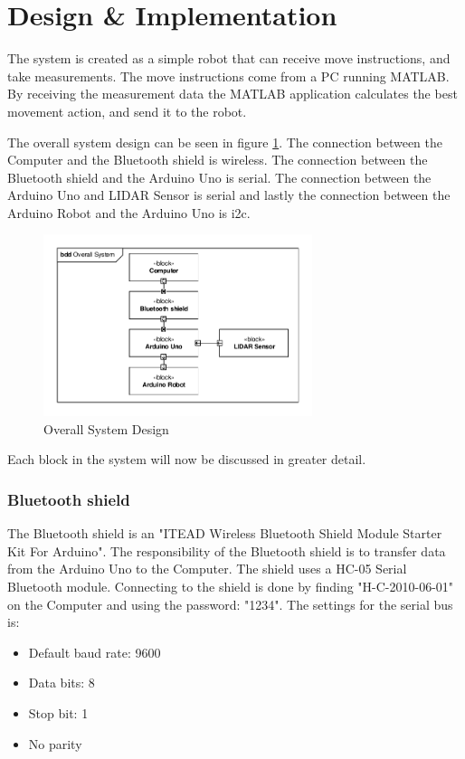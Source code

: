 \section{Design \& Implementation}
The system is created as a simple robot that can receive move instructions, and take measurements. The move instructions come from a PC running MATLAB. By receiving the measurement data the MATLAB application calculates the best movement action, and send it to the robot. 

The overall system design can be seen in figure \ref{fig:OSD}. The connection between the Computer and the Bluetooth shield is wireless. The connection between the Bluetooth shield and the Arduino Uno is serial. The connection between the Arduino Uno and LIDAR Sensor is serial and lastly the connection between the Arduino Robot and the Arduino Uno is i2c.
\begin{figure}[H]
\centering
\includegraphics[width=0.7\textwidth]{billeder/OverallSystemDesign}
\caption{Overall System Design}
\label{fig:OSD}
\end{figure}
Each block in the system will now be discussed in greater detail. 

\subsubsection{Bluetooth shield}
The Bluetooth shield is an "ITEAD Wireless Bluetooth Shield Module Starter Kit For Arduino"\cite{BTshield}\cite{BTshield2}. The responsibility of the Bluetooth shield is to transfer data from the Arduino Uno to the Computer. The shield uses a HC-05 Serial Bluetooth module. Connecting to the shield is done by finding "H-C-2010-06-01" on the Computer and using the password: "1234". The settings for the serial bus is:
\begin{itemize}
\item Default baud rate: 9600
\item Data bits: 8
\item Stop bit: 1
\item No parity
\end{itemize}


